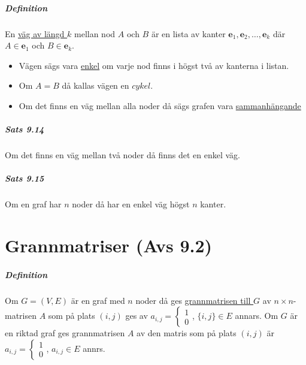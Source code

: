 \paragraph{Definition} En \underline{väg av längd $k$} mellan nod $A$ och $B$ är en lista av kanter $\bm{e}_1,\bm{e}_2,\ldots,\bm{e}_k$ där $A\in\bm{e}_1$ och $B\in\bm{e}_k$.
\begin{itemize}
    \item Vägen sägs vara \underline{enkel} om varje nod finns i högst två av kanterna i listan.
    \item Om $A=B$ då kallas vägen en $cykel$.
    \item Om det finns en väg mellan alla noder då sägs grafen vara \underline{sammanhängande}
\end{itemize}

\paragraph{Sats 9.14} Om det finns en väg mellan två noder då finns det en enkel väg.

\paragraph{Sats 9.15} Om en graf har $n$ noder då har en enkel väg högst $n$ kanter.

\chapter{Grannmatriser (Avs 9.2)}

\paragraph{Definition} Om $G=(V,E)$ är en graf med $n$ noder då ges \underline{grannmatrisen till $G$} av $n\times n$-matrisen $A$ som på plats $(i,j)$ ges av $a_{i,j}=\left\lbrace\begin{matrix}1\\0\end{matrix}\right.$, $\{i,j\}\in E$ annars.
Om $G$ är en riktad graf ges grannmatrisen $A$ av den matris som på plats $(i,j)$ är $a_{i,j}=\left\lbrace\begin{matrix}1\\0\end{matrix}\right.$, $a_{i,j}\in E$ annrs.

